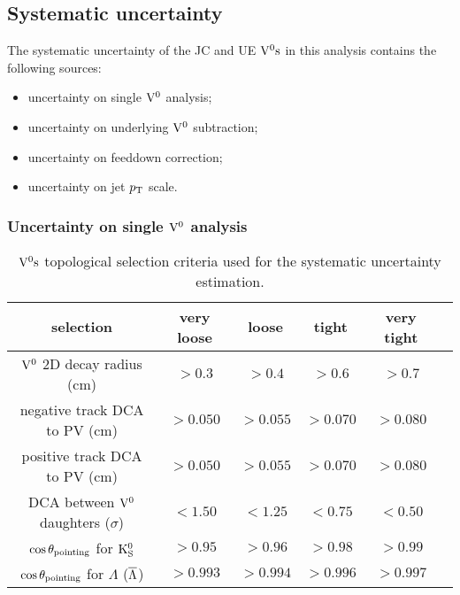 \subsection{Systematic uncertainty}

The systematic uncertainty of the JC and UE ${\rm V}^{0}{\rm s}$ in this analysis contains
the following sources:
\begin{itemize}
\item uncertainty on single ${\rm V}^{0}$ analysis;
\item uncertainty on underlying ${\rm V}^{0}$ subtraction;
\item uncertainty on feeddown correction;
\item uncertainty on jet $p_{\rm T}$ scale.
\end{itemize}

\subsubsection{Uncertainty on single ${\rm V}^{0}$ analysis}
\label{sec:c06SystSingleV0s}

\begin{table}[htdp]
\begin{center}
\begin{tabular}{|c|c|c|c|c|c|}
\hline
selection & very loose & loose & tight & very tight \\
\hline
${\rm V}^{0}$ 2D decay radius (cm)  &
$>0.3$    & $>0.4$     &  $>0.6$  & $>0.7$ \\
\hline
negative track DCA to PV (cm)  &
$>0.050$  & $>0.055$   & $>0.070$ & $>0.080$ \\
\hline
positive track DCA to PV (cm)  &
$>0.050$  & $>0.055$   & $>0.070$ & $>0.080$ \\
\hline
DCA between ${\rm V}^{0}$ daughters ($\sigma$) &
$<1.50$   & $<1.25$    & $<0.75$  & $<0.50$ \\
\hline
$\cos\theta_{\rm pointing}$ for ${\rm K}_{\rm S}^{0}$ &
$>0.95$   & $>0.96$    & $>0.98$  & $>0.99$ \\
\hline
$\cos\theta_{\rm pointing}$ for $\Lambda$ ($\overline{\Lambda}$) &
$>0.993$ & $>0.994$    & $>0.996$ & $>0.997$ \\
\hline
\end{tabular}
\end{center}
\caption{${\rm V}^{0}{\rm s}$ topological selection criteria used for the
         systematic uncertainty estimation.}
\label{tab:c06TopoVars}
\end{table}


